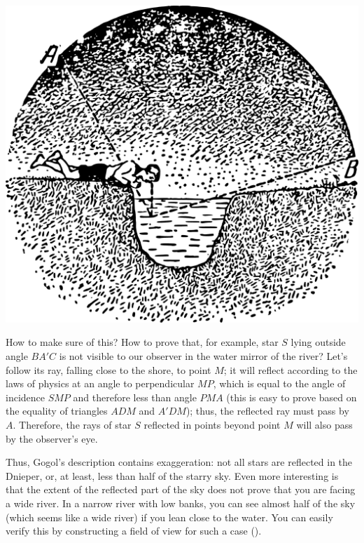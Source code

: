 \begin{marginfigure}[2cm]%
\centering
\includegraphics[width=1.\textwidth]{figures/ch-02/fig-055.pdf}
\end{marginfigure}

How to make sure of this? How to prove that, for example, star $S$ lying outside angle $BA'C$ is not visible to our observer in the water mirror of the river? Let's follow its ray, falling close to the shore, to point $M$; it will reflect according to the laws of physics at an angle to perpendicular $MP$, which is equal to the angle of incidence $SMP$ and therefore less than angle $PMA$ (this is easy to prove based on the equality of triangles $ADM$ and $A'DM$); thus, the reflected ray must pass by $A$. Therefore, the rays of star $S$ reflected in points beyond point $M$ will also pass by the observer's eye.



Thus, Gogol's description contains exaggeration: not all stars are reflected in the Dnieper, or, at least, less than half of the starry sky. Even more interesting is that the extent of the reflected part of the sky does not prove that you are facing a wide river. In a narrow river with low banks, you can see almost half of the sky (which seems like a wide river) if you lean close to the water. You can easily verify this by constructing a field of view for such a case ().


